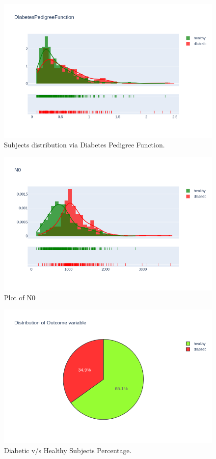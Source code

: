 \documentclass[12pt]{article}
\begin{document}
\begin{figure}[ht]
\centering
\includegraphics[width=1\textwidth]{13.png}
\caption{\label{fig:4} Subjects distribution via Diabetes Pedigree Function.}
\end{figure}


\begin{figure}[ht]
\centering
\includegraphics[width=1\textwidth]{15.png}
\caption{\label{fig:6} Plot of N0}
\end{figure}


\begin{figure}[ht]
\centering
\includegraphics[width=1\textwidth]{2.png}
\caption{\label{fig:9} Diabetic v/s Healthy Subjects Percentage.}
\end{figure}
\end{document}
